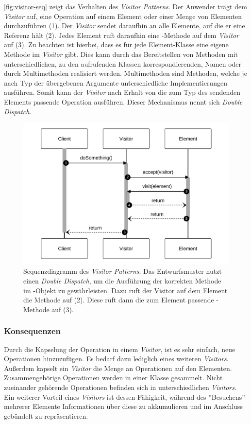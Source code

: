 \autoref{fig:visitor-seq} zeigt das Verhalten des \emph{Visitor Patterns}. Der Anwender trägt dem \emph{Visitor} auf, eine Operation auf einem Element oder einer Menge von Elementen durchzuführen (1). Der \emph{Visitor} sendet daraufhin  an alle Elemente, auf die er eine Referenz hält (2). Jedes Element ruft daraufhin eine -Methode auf dem \emph{Visitor} auf (3). Zu beachten ist hierbei, dass es für jede Element-Klasse eine eigene Methode im \emph{Visitor} gibt. Dies kann durch das Bereitstellen von Methoden mit unterschiedlichen, zu den aufrufenden Klassen korrespondierenden, Namen oder durch Multimethoden realisiert werden. Multimethoden sind Methoden, welche je nach Typ der übergebenen Argumente unterschiedliche Implementierungen ausführen. Somit kann der \emph{Visitor} nach Erhalt von  die zum Typ des sendenden Elements passende Operation ausführen. Dieser Mechanismus nennt sich \emph{Double Dispatch}.

\begin{figure}[!ht]
	\centering
	\includegraphics[width=0.75\linewidth]{images/patterns/visitor-seq.pdf}
	\caption{Sequenzdiagramm des \emph{Visitor Patterns}. Das Entwurfsmuster nutzt einen \emph{Double Dispatch}, um die Ausführung der korrekten Methode im -Objekt zu gewährleisten. Dazu ruft der Visitor auf dem Element die Methode  auf (2). Diese ruft dann die zum Element passende -Methode auf (3). \cite{skobeleva_visitor_2023}}
	\label{fig:visitor-seq}
\end{figure}

\subsubsection*{Konsequenzen}
Durch die Kapselung der Operation in einem \emph{Visitor}, ist es sehr einfach, neue Operationen hinzuzufügen. Es bedarf dazu lediglich eines weiteren \emph{Visitors}. Außerdem kapselt ein \emph{Visitor} die Menge an Operationen auf den Elementen. Zusammengehörige Operationen werden in einer Klasse gesammelt. Nicht zueinander gehörende Operationen befinden sich in unterschiedlichen \emph{Visitors}. Ein weiterer Vorteil eines \emph{Visitors} ist dessen Fähigkeit, während des ''Besuchens'' mehrerer Elemente Informationen über diese zu akkumulieren und im Anschluss gebündelt zu repräsentieren.

